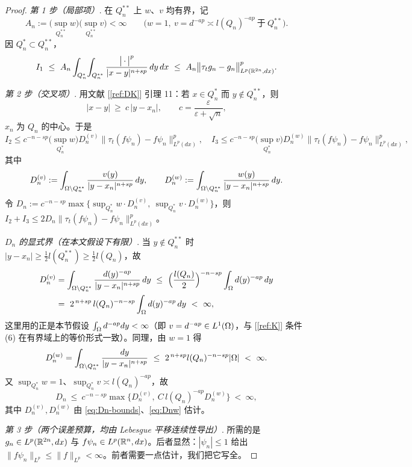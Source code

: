 \begin{proof}
\emph{第 1 步（局部项）}. 在 $Q_n^{**}$ 上 $w$、$v$ 均有界，记
\[
  A_n:=\Big(\sup_{Q_n^{**}}w\Big)\Big(\sup_{Q_n^{**}}v\Big)<\infty
  \qquad\bigl(w=1,\ v=d^{-ap}\asymp l(Q_n)^{-ap}\ \text{于}\ Q_n^{**}\bigr).
\]
因 $Q_n^{*}\subset Q_n^{**}$，
\[
  I_1\ \le\ A_n\int_{Q_n^{*}}\!\int_{Q_n^{**}}
  \frac{\bigl|\,\cdot\,\bigr|^p}{|x-y|^{n+sp}}\,dy\,dx
  \ \le\ A_n\big\|\tau_tg_n-g_n\big\|^p_{L^p(\R^{2n},dx)} .
\]

\emph{第 2 步（交叉项）}. 用文献 [\ref{ref:DK}] 引理 11：若 $x\in Q_n^{*}$ 而 $y\notin Q_n^{**}$，则
\[
  |x-y|\ \ge\ c\,|y-x_n|,\qquad c=\frac{\varepsilon}{\varepsilon+\sqrt n},
\]
$x_n$ 为 $Q_n$ 的中心。于是
\[
  I_2\le c^{-n-sp}\Big(\sup_{Q_n^{*}}w\Big)D_n^{(v)}
  \big\|\tau_t(f\psi_n)-f\psi_n\big\|^p_{L^p(dx)},\quad
  I_3\le c^{-n-sp}\Big(\sup_{Q_n^{*}}v\Big)D_n^{(w)}
  \big\|\tau_t(f\psi_n)-f\psi_n\big\|^p_{L^p(dx)},
\]
其中
\[
  D_n^{(v)}:=\int_{\Omega\setminus Q_n^{**}}\frac{v(y)}{|y-x_n|^{n+sp}}\,dy,\qquad
  D_n^{(w)}:=\int_{\Omega\setminus Q_n^{**}}\frac{w(y)}{|y-x_n|^{n+sp}}\,dy .
\]
令 $D_n:=c^{-n-sp}\max\big\{\sup_{Q_n^{*}}w\cdot D_n^{(v)},\ \sup_{Q_n^{*}}v\cdot D_n^{(w)}\big\}$，则
$I_2+I_3\le 2D_n\|\tau_t(f\psi_n)-f\psi_n\|^p_{L^p(dx)}$。

\emph{$D_n$ 的显式界（在本文假设下有限）}.
当 $y\notin Q_n^{**}$ 时 $|y-x_n|\ge\tfrac12l(Q_n^{**})\ge\tfrac12l(Q_n)$，故
\begin{equation}\label{eq:Dn-bounds}
  \begin{aligned}
    D_n^{(v)}&=\int_{\Om\setminus Q_n^{**}}\frac{d(y)^{-ap}}{|y-x_n|^{n+sp}}\,dy
    \ \le\ \Big(\frac{l(Q_n)}{2}\Big)^{-n-sp}\int_\Om d(y)^{-ap}\,dy\\
    &=\ 2^{\,n+sp}\,l(Q_n)^{-n-sp}\int_\Om d(y)^{-ap}\,dy\ <\ \infty ,
  \end{aligned}
\end{equation}
这里用的正是本节假设 $\int_\Omega d^{-ap}dy<\infty$（即 $v=d^{-ap}\in L^1(\Omega)$，与 [\ref{ref:K}] 条件 (6)
在有界域上的等价形式一致）。同理，由 $w=1$ 得
\begin{equation}\label{eq:Dnw}
  D_n^{(w)}=\int_{\Omega\setminus Q_n^{**}}\frac{dy}{|y-x_n|^{n+sp}}
  \ \le\ 2^{\,n+sp}l(Q_n)^{-n-sp}|\Omega|\ <\ \infty .
\end{equation}
又 $\sup_{Q_n^{*}}w=1$、$\sup_{Q_n^{*}}v\asymp l(Q_n)^{-ap}$，故
\[
  D_n\ \le\ c^{-n-sp}\max\big\{D_n^{(v)},\ C\,l(Q_n)^{-ap}D_n^{(w)}\big\}\ <\ \infty ,
\]
其中 $D_n^{(v)},D_n^{(w)}$ 由 \eqref{eq:Dn-bounds}、\eqref{eq:Dnw} 估计。

\emph{第 3 步（两个误差预算，均由 Lebesgue 平移连续性导出）}.
所需的是 $g_n\in L^p(\mathbb{R}^{2n},dx)$ 与 $f\psi_n\in L^p(\mathbb{R}^n,dx)$。后者显然：$|\psi_n|\le1$ 给出
$\|f\psi_n\|_{L^p}\le\|f\|_{L^p}<\infty$。前者需要一点估计，我们把它写全。


\end{proof}
